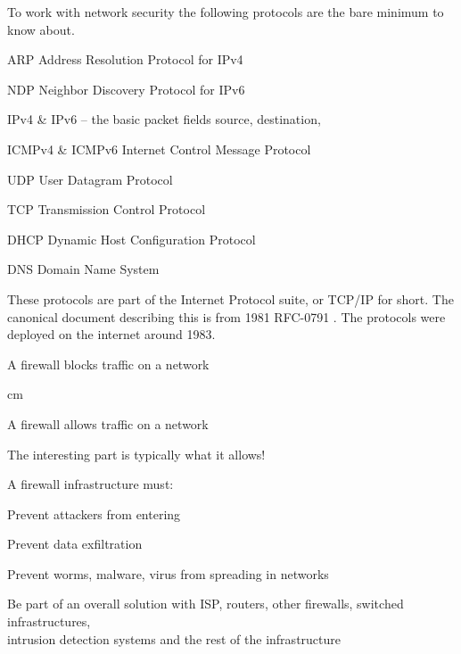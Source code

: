 \documentclass[Screen16to9,17pt]{foils}
\begin{document}



To work with network security the following protocols are the bare minimum to know about.

\begin{list2}
\item ARP Address Resolution Protocol for IPv4
\item NDP Neighbor Discovery Protocol for IPv6
\item IPv4 \& IPv6 -- the basic packet fields source, destination,
\item ICMPv4 \& ICMPv6 Internet Control Message Protocol
\item UDP User Datagram Protocol
\item TCP Transmission Control Protocol
\item DHCP Dynamic Host Configuration Protocol
\item DNS Domain Name System
\end{list2}

These protocols are part of the Internet Protocol suite, or TCP/IP for short. The canonical document describing this is from 1981 RFC-0791 . The protocols were deployed on the internet around 1983.










\centerline{\hlkbig A firewall {\color{security6blue}blocks traffic} on a network}

 cm
\pause

\centerline{\hlkbig A firewall {\color{red}allows traffic} on a network}
{\small The interesting part is typically what it allows!}

\begin{list1}
\item A firewall infrastructure must:
\begin{list2}
\item Prevent attackers from entering
\item Prevent data exfiltration
\item Prevent worms, malware, virus from spreading in networks
\item Be part of an overall solution with ISP, routers, other firewalls, switched infrastructures,\\
  intrusion detection systems and the rest of the infrastructure
\end{list2}
\end{list1}
\end{document}
